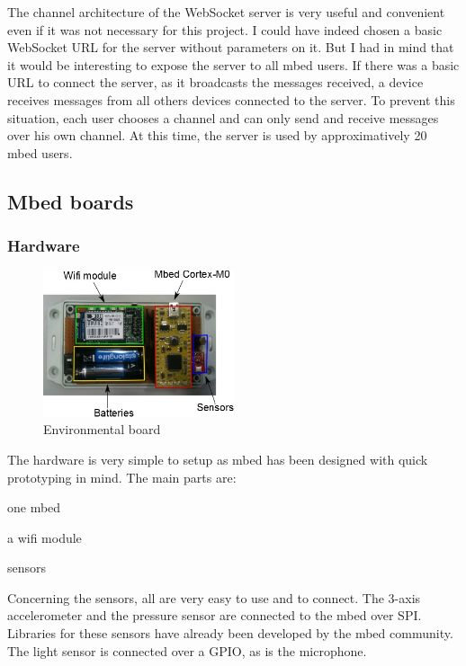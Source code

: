 \documentclass[pdftex,10pt,a4paper]{report}
\newenvironment{packed_item}{
\begin{itemize}
  \setlength{\itemsep}{1pt}
  \setlength{\parskip}{0pt}
  \setlength{\parsep}{0pt}
}{\end{itemize}}
\begin{document}
The channel architecture of the WebSocket server is very useful and convenient even if it was not necessary for this project. I could have indeed chosen a basic WebSocket URL for the server without parameters on it. But I had in mind that it would be interesting to expose the server to all mbed users. If there was a basic URL to connect the server, as it broadcasts the messages received, a device receives messages from all others devices connected to the server. To prevent this situation, each user chooses a channel and can only send and receive messages over his own channel. At this time, the server is used by approximatively 20 mbed users.


\subsection{Mbed boards}
\subsubsection{Hardware}

\begin{figure}[h!]
		\centering
		\includegraphics[width=0.5\textwidth]{./env_board.jpg}
		\caption{Environmental board}
		\label{Environmental board}
\end{figure}

The hardware is very simple to setup as mbed has been designed with quick prototyping in mind. The main parts are:
\begin{packed_item}
	\item one mbed
	\item a wifi module
	\item sensors
\end{packed_item}

Concerning the sensors, all are very easy to use and to connect. The 3-axis accelerometer and the pressure sensor are connected to the mbed over SPI. Libraries for these sensors have already been developed by the mbed community. The light sensor is connected over a GPIO, as is the microphone. 
\end{document}
